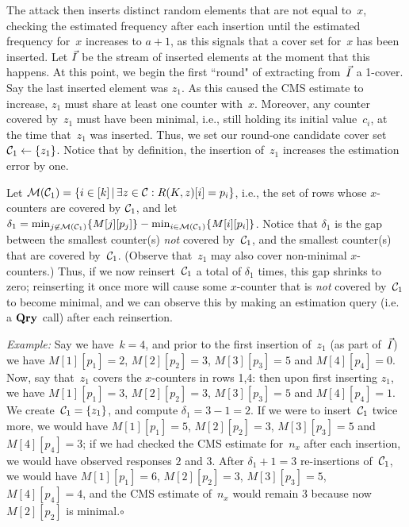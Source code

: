 The attack then inserts distinct random elements that are not equal to~$x$, checking the estimated frequency after each insertion until the estimated frequency for~$x$ increases to $a+1$, as this signals that a cover set for~$x$ has been inserted. Let $\vec{I}$ be the stream of inserted elements at the moment that this happens.  At this point, we begin the first ``round" of extracting from~$\vec{I}$ a 1-cover.  Say the last inserted element was $z_1$. As this caused the CMS estimate to increase, $z_1$ must share at least one counter with~$x$.  Moreover, any counter covered by~$z_1$ must have been minimal, i.e., still holding its initial value~$c_i$, at the time that~$z_1$ was inserted.  Thus, we set our round-one candidate cover set~$\mathcal{C}_1\gets\{z_1\}$.  Notice that by definition, the insertion of~$z_1$ increases the estimation error by one.

Let $\mathcal{M}(\mathcal{C}_1)=\{i \in [k] \,|\, \exists z \in \mathcal{C}: R(K,z)[i]=p_i\}$, i.e., the set of rows whose $x$-counters are covered by $\mathcal{C}_1$, and let $\delta_1 = \min_{j \not\in \mathcal{M}(\mathcal{C}_1)}\{M[j][p_j]\} - \min_{i \in \mathcal{M}(\mathcal{C}_1)}\{M[i][p_i]\}$.  Notice that $\delta_1$ is the gap between the smallest counter(s) \emph{not} covered by~$\mathcal{C}_1$, and the smallest counter(s) that are covered by~$\mathcal{C}_1$.  (Observe that~$z_1$ may also cover non-minimal $x$-counters.)  Thus, if we now reinsert~$\mathcal{C}_1$ a total of $\delta_1$ times, this gap shrinks to zero; reinserting it once more will cause some $x$-counter that is \emph{not} covered by~$\mathcal{C}_1$ to become minimal, and we can observe this by making an estimation query (i.e. a $\textup{\textbf{Qry}}\hspace{0.5pt}$ call) after each reinsertion.  

\noindent\textit{Example: }
Say we have~$k=4$, and prior to the first insertion of~$z_1$ (as part of~$\vec{I}$) we have $M[1][p_1]=2$, $M[2][p_2]=3$, $M[3][p_3]=5$ and $M[4][p_4]=0$. Now, say that~$z_1$ covers the $x$-counters in rows 1,4: then upon first inserting $z_1$, we have $M[1][p_1]=3$, $M[2][p_2]=3$, $M[3][p_3]=5$ and $M[4][p_4]=1$.  We create~$\mathcal{C}_1=\{z_1\}$, and compute $\delta_1 = 3-1=2$.  If we were to insert~$\mathcal{C}_1$ twice more, we would have $M[1][p_1]=5$, $M[2][p_2]=3$, $M[3][p_3]=5$ and $M[4][p_4]=3$; if we had checked the CMS estimate for~$n_x$ after each insertion, we would have observed responses $2$ and $3$.  After $\delta_1+1=3$ re-insertions of~$\mathcal{C}_1$, we would have $M[1][p_1]=6$, $M[2][p_2]=3$, $M[3][p_3]=5$, $M[4][p_4]=4$, and the CMS estimate of~$n_x$ would remain $3$ because now $M[2][p_2]$ is minimal.\hfill$\circ$


